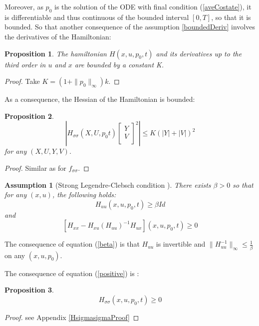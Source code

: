 \documentclass[a4paper,10pt]{article}
\newtheorem{proposition}{Proposition}
\newtheorem{assumption}{Assumption}
\begin{document}
Moreover, as $p_{0}$ is the solution of the ODE with final condition (\ref{aveCostate}), it is 
differentiable and thus continuous of the bounded interval $[0,T]$, 
so that it is bounded. So that another consequence  of the 
assumption \ref{boundedDeriv} involves the derivatives of the 
Hamiltonian:
\begin{proposition}
    The hamiltonian $H(x,u,p_{0},t)$ and its derivatives up to the 
    third order in $u$ and $x$ are bounded by a constant K.
\end{proposition}
\begin{proof}
    Take $K=(1+\|p_{0}\|_{\infty}) k$.
\end{proof}
As a consequence, the Hessian of the Hamiltonian is bounded: 
\begin{proposition}
\begin{equation}
        \left|H_{\sigma \sigma}(X,U,p_{0}t)\left[
        \begin{array}
        {c}
            
            Y  \\
            
            V  \\
            
             
        \end{array}
        \right]^{2}\right| \leq K(|Y|+|V|)^{2}
    \label{HsigmasigmaEq}
\end{equation}
for any $(X,U,Y,V)$.
\end{proposition}
\begin{proof}
    Similar as for $f_{\sigma \sigma}$.
\end{proof}
\begin{assumption}[Strong Legendre-Clebsch condition \cite{Bry1}]\label{convexity}
    There exists $\beta > 0$ so that for any $(x,u)$, the following 
    holds:
    \begin{equation}
        H_{uu}(x,u,p_{0},t) \ge \beta Id
        \label{beta}
    \end{equation}
   and
   \begin{equation}
       \left[H_{xx} - H_{xu}(H_{uu})^{-1}H_{ux}\right](x,u,p_{0},t) \ge 0
       \label{positive}
   \end{equation}
\end{assumption}
The consequence of equation (\ref{beta}) is that $H_{uu}$ is 
invertible and $\|H_{uu}^{-1}\|_{\infty} \le \frac{1}{\beta} $ on any 
$(x,u,p_{0})$.

The consequence of equation (\ref{positive}) is :
\begin{proposition}\label{Hsigmasigma}
    \begin{equation}
        H_{\sigma \sigma}(x,u,p_{0},t) \ge 0
        \label{positive1}
    \end{equation}
\end{proposition}
\begin{proof}
	see Appendix \ref{HsigmasigmaProof}
 \end{proof}
\end{document}
